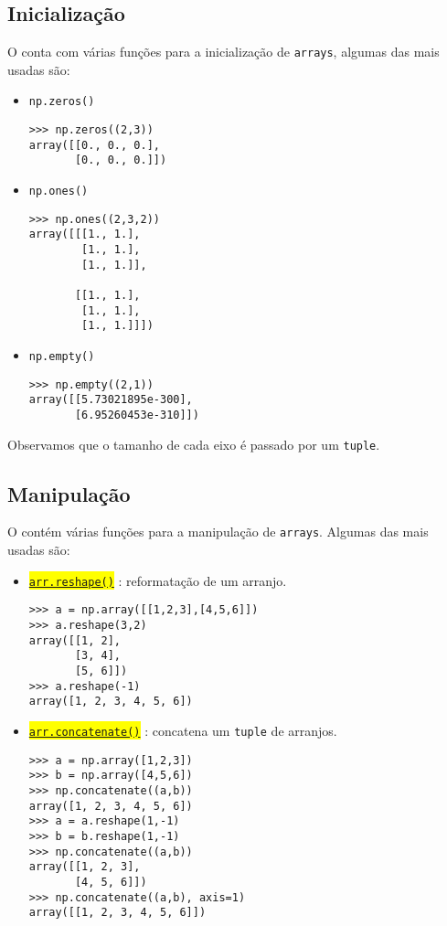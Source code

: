 \subsection{Inicialização}

O {\numpy} conta com várias funções para a inicialização de \lstinline+arrays+, algumas das mais usadas são:
\begin{itemize}
\item \lstinline+np.zeros()+ 
\begin{lstlisting}
>>> np.zeros((2,3))
array([[0., 0., 0.],
       [0., 0., 0.]])
\end{lstlisting}

\item \lstinline+np.ones()+ 
\begin{lstlisting}
>>> np.ones((2,3,2))
array([[[1., 1.],
        [1., 1.],
        [1., 1.]],

       [[1., 1.],
        [1., 1.],
        [1., 1.]]])
\end{lstlisting}

\item \lstinline+np.empty()+ 
\begin{lstlisting}
>>> np.empty((2,1))
array([[5.73021895e-300],
       [6.95260453e-310]])
\end{lstlisting}
\end{itemize}
Observamos que o tamanho de cada eixo é passado por um \lstinline+tuple+.

\subsection{Manipulação}

O {\numpy} contém várias funções para a manipulação de \lstinline+arrays+. Algumas das mais usadas são:
\begin{itemize}
\item \hl{{\href{https://numpy.org/doc/stable/reference/generated/numpy.reshape.html\#numpy.reshape}{\lstinline+arr.reshape()+}}} : reformatação de um arranjo.
\begin{lstlisting}
>>> a = np.array([[1,2,3],[4,5,6]])
>>> a.reshape(3,2)
array([[1, 2],
       [3, 4],
       [5, 6]])
>>> a.reshape(-1)
array([1, 2, 3, 4, 5, 6])
\end{lstlisting}
\item \hl{{\href{https://numpy.org/doc/stable/reference/generated/numpy.concatenate.html}{\lstinline+arr.concatenate()+}}} : concatena um \lstinline+tuple+ de arranjos.
\begin{lstlisting}
>>> a = np.array([1,2,3])
>>> b = np.array([4,5,6])
>>> np.concatenate((a,b))
array([1, 2, 3, 4, 5, 6])
>>> a = a.reshape(1,-1)
>>> b = b.reshape(1,-1)
>>> np.concatenate((a,b))
array([[1, 2, 3],
       [4, 5, 6]])
>>> np.concatenate((a,b), axis=1)
array([[1, 2, 3, 4, 5, 6]])
\end{lstlisting}
\end{itemize}

